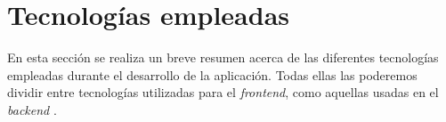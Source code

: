 \section{Tecnologías empleadas}

En esta sección se realiza un breve resumen acerca de las diferentes tecnologías empleadas durante el desarrollo de la aplicación. Todas ellas las poderemos dividir entre tecnologías utilizadas para el {\it frontend}, como aquellas usadas en el {\it backend} \cite{frontend}.


